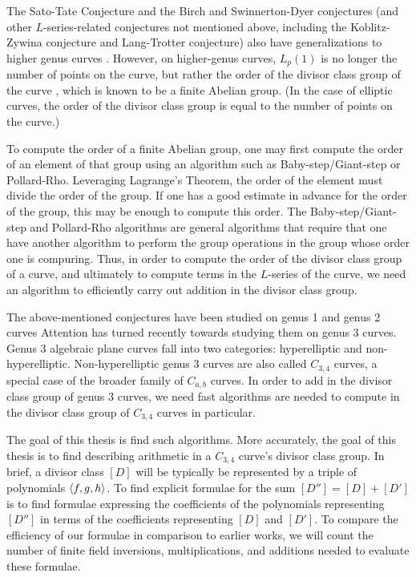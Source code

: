 The Sato-Tate Conjecture and the Birch and Swinnerton-Dyer conjectures
(and other $L$-series-related conjectures not mentioned above,
including the Koblitz-Zywina conjecture and Lang-Trotter conjecture)
also have generalizations to higher genus curves \cite{sutherland16} \cite{sutherland18}.
However, on higher-genus curves, $L_p(1)$ is no longer the number of points on the curve,
but rather the order of the divisor class group of the curve \cite{kedlaya08},
which is known to be a finite Abelian group.
(In the case of elliptic curves, the order of the divisor class group is
equal to the number of points on the curve.)

To compute the order of a finite Abelian group, one may first compute the order of an element of that group
using an algorithm such as Baby-step/Giant-step or Pollard-Rho.
Leveraging Lagrange's Theorem, the order of the element must divide the order of the group.
If one has a good estimate in advance for the order of the group, this may be enough
to compute this order.
The Baby-step/Giant-step and Pollard-Rho algorithms are general algorithms that
require that one have another algorithm to perform the group operations in the group
whose order one is compuring.
Thus, in order to compute the order of the divisor class group of a curve,
and ultimately to compute terms in the $L$-series of the curve,
we need an algorithm to efficiently carry out addition in the divisor class group.

The above-mentioned conjectures have been studied on genus 1 and genus 2 curves \cite{kedlaya08}
Attention has turned recently towards studying them on genus 3 curves.
Genus 3 algebraic plane curves fall into two categories: hyperelliptic and non-hyperelliptic.
Non-hyperelliptic genus 3 curves are also called $C_{3,4}$ curves, a special case of the broader family of $C_{a,b}$ curves.
In order to add in the divisor class group of genus 3 curves,
we need fast algorithms are needed to compute in the divisor class group of $C_{3,4}$ curves in particular.

The goal of this thesis is find such algorithms.
More accurately, the goal of this thesis is to find  describing arithmetic in a $C_{3,4}$ curve's divisor class group.
In brief, a divisor class $[D]$ will be typically be represented by a triple of polynomials $\left\langle f,g,h \right\rangle$.
To find explicit formulae for the sum $[D''] = [D] + [D']$ is to find formulae expressing the coefficients of the
polynomials representing $[D'']$ in terms of the coefficients representing $[D]$ and $[D']$.
To compare the efficiency of our formulae in comparison to earlier works,
we will count the number of finite field inversions, multiplications, and additions needed to evaluate these formulae.



